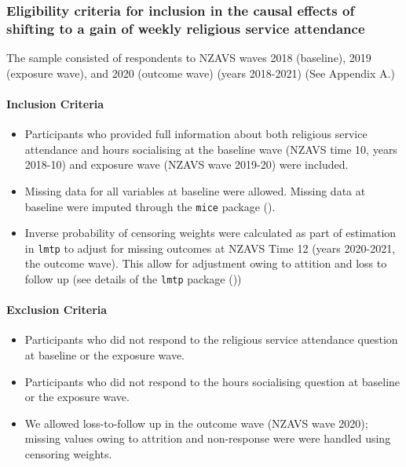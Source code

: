 \documentclass[
  singlecolumn]{article}
\let\oldparagraph\paragraph
\renewcommand{\paragraph}[1]{\oldparagraph{#1}\mbox{}}
\providecommand{\tightlist}{%
  \setlength{\itemsep}{0pt}\setlength{\parskip}{0pt}}\usepackage{longtable,booktabs,array}
\begin{document}
\subsubsection{Eligibility criteria for inclusion in the causal effects
of shifting to a gain of weekly religious service
attendance}\label{eligibility-criteria-for-inclusion-in-the-causal-effects-of-shifting-to-a-gain-of-weekly-religious-service-attendance}

The sample consisted of respondents to NZAVS waves 2018 (baseline), 2019
(exposure wave), and 2020 (outcome wave) (years 2018-2021) (See Appendix
A.)

\paragraph{Inclusion Criteria}\label{inclusion-criteria}

\begin{itemize}
\tightlist
\item
  Participants who provided full information about both religious
  service attendance and hours socialising at the baseline wave (NZAVS
  time 10, years 2018-10) and exposure wave (NZAVS wave 2019-20) were
  included.
\item
  Missing data for all variables at baseline were allowed. Missing data
  at baseline were imputed through the \texttt{mice} package
  ().
\item
  Inverse probability of censoring weights were calculated as part of
  estimation in \texttt{lmtp} to adjust for missing outcomes at NZAVS
  Time 12 (years 2020-2021, the outcome wave). This allow for adjustment
  owing to attition and loss to follow up (see details of the
  \texttt{lmtp} package ())
\end{itemize}

\paragraph{Exclusion Criteria}\label{exclusion-criteria}

\begin{itemize}
\tightlist
\item
  Participants who did not respond to the religious service attendance
  question at baseline or the exposure wave.
\item
  Participants who did not respond to the hours socialising question at
  baseline or the exposure wave.
\item
  We allowed loss-to-follow up in the outcome wave (NZAVS wave 2020);
  missing values owing to attrition and non-response were were handled
  using censoring weights.
\end{itemize}
\end{document}
